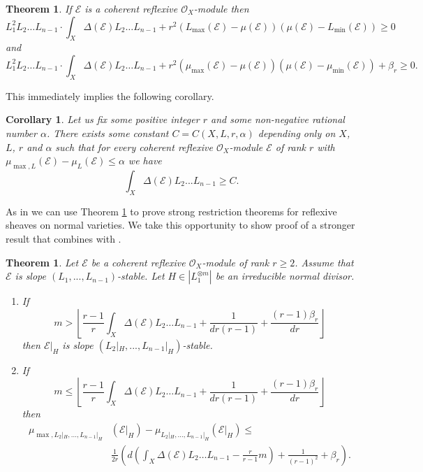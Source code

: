 \documentclass[12pt]{article}
\theoremstyle{plain}
\newtheorem{Theorem}[Thm]{\sc Theorem}
\newtheorem{Corollary}[Thm]{\sc Corollary}
\theoremstyle{definition}
\theoremstyle{remark}
\newcommand{\cE}{{\mathcal E}}
\newcommand{\cO}{{\mathcal O}}
\begin{document}
\begin{Theorem}\label{Bogomolov-unstable-inequality}
		If $\cE$ is a coherent reflexive $\cO_X$-module then 
	$$L_1^2L_2\dots L_{n-1}\cdot
\int_X	\Delta (\cE)L_2\dots L_{n-1}+ r^2(L_{\max} (\cE) -\mu  (\cE)) (\mu (\cE) -L_{\min} (\cE) )\ge 0
	$$
	and
	$$L_1^2L_2\dots L_{n-1}\cdot
\int_X	\Delta (\cE)L_2\dots L_{n-1}+r^2(\mu_{\max} (\cE) -\mu (\cE)) (\mu (\cE) -\mu_{\min} (\cE) ) +
	\beta _r \ge 0.$$
\end{Theorem}

This immediately implies the following corollary.

\begin{Corollary}\label{Bogomolov's-inequality}
	Let us fix some positive integer $r$ and some non-negative rational number $\alpha$.
	There exists some constant $C=C(X,L,r,\alpha)$ depending only on $X$, $L$, $r$ and $\alpha$ such that for every  coherent reflexive $\cO_X$-module $\cE$ of rank $r$ with
	$\mu _{\max ,L } (\cE)-\mu _L (\cE)\le \alpha$ we have
	$$\int _X \Delta (\cE) L_2...L_{n-1}\ge C.$$
\end{Corollary}

\medskip

As in \cite{La1} we can use Theorem \ref{Bogomolov-unstable-inequality} to prove strong restriction theorems for reflexive sheaves on normal varieties. We take this opportunity to 
show proof of a stronger result that combines \cite[Theorem 5.2]{La1} with \cite[Theorem 3.7]{La7}.

\begin{Theorem}\label{strong-restriction-stable}
	Let  $\cE$ be a coherent reflexive $\cO_X$-module of rank $r\ge 2$. Assume that $\cE$ is slope $(L_1,...,L_{n-1})$-stable.  Let $H\in |L_1^{\otimes m}|$  be an irreducible normal divisor.  
	\begin{enumerate}
		\item 	 If 
		$$m>\left\lfloor \frac{r-1}{ r}\int_X\Delta (\cE)L_2\dots L_{n-1} +\frac{1}{dr(r-1)}
		+\frac{(r-1)\beta _r}{dr}\right\rfloor$$
		then $\cE|_H$ is  slope $(L_2|_H,...,L_{n-1}|_H)$-stable.
		\item 	If
		$$m\le \left\lfloor \frac{r-1}{ r}\int_X\Delta (\cE)L_2\dots L_{n-1} +\frac{1}{dr(r-1)}
		+\frac{(r-1)\beta _r}{dr}\right\rfloor$$
		then
		\begin{align*}
			\mu _{\max, L_2|_H,...,L_{n-1}|_H }& (\cE|_H)-\mu _{ L_2|_H,...,L_{n-1}|_H } (\cE|_H)\le\\ 
			&\frac{1}{2r}\left( d  \left(\int_X \Delta (\cE )L_2\dots L_{n-1}-\frac{r}{r-1}m
			\right)+\frac{1}{(r-1)^2}+{\beta_r}\right).
		\end{align*}
	\end{enumerate}
\end{Theorem}
\end{document}
